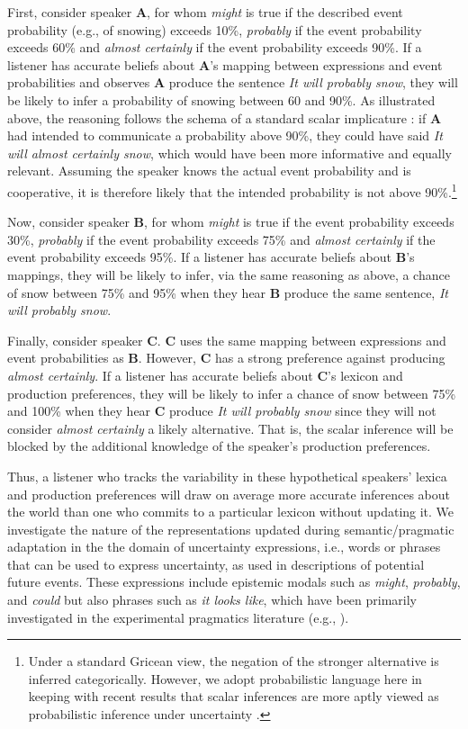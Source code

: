 \documentclass[man, floatsintext]{apa6}
\begin{document}
First, consider speaker {\bf A}, for whom \textit{might} is true if the described event probability (e.g., of snowing) exceeds 10\%, 
\textit{probably} if the event probability exceeds 60\% and \textit{almost certainly}  if the event probability exceeds 90\%.  If a listener has accurate beliefs about {\bf A}'s mapping between expressions and event probabilities and observes {\bf A}  produce the sentence \emph{It will probably snow}, they will be likely to infer a probability of snowing between 60 and 90\%. As illustrated above, the reasoning follows the schema of a standard scalar implicature \parencite{Grice1975, Horn1984}: if  {\bf A} had intended to communicate a probability above 90\%, they could have said \emph{It will almost certainly snow}, which would have been more informative and equally relevant. Assuming the speaker knows the actual event probability and is cooperative, it is therefore likely that the intended probability is not above 90\%.\footnote{Under a standard Gricean view, the negation of the stronger alternative is inferred categorically. However, we adopt probabilistic language here in keeping with recent results that scalar inferences are more aptly viewed as probabilistic inference under uncertainty \parencite{Goodman2013}.} 

Now, consider speaker {\bf B}, for whom \textit{might} is true if the event probability exceeds 30\%, 
\textit{probably} if the event probability exceeds 75\% and \textit{almost certainly}  if the event probability exceeds 95\%. If a listener has
accurate beliefs about {\bf B}'s mappings, they will be likely to infer, via the same reasoning as above, a chance of snow between 75\% and 95\% when they hear {\bf B} produce the same sentence, \textit{It will probably snow}.

Finally, consider speaker {\bf C}. {\bf C} uses the same mapping between expressions and event probabilities as {\bf B}. However, {\bf C} has a strong preference against 
producing \textit{almost certainly}. If a listener has accurate beliefs about {\bf C}'s lexicon and production preferences, 
they will be likely to infer a chance of snow between 75\% and 100\% when they hear {\bf C} produce \textit{It will probably snow} since they will not
consider  \textit{almost certainly} a likely alternative. That is, the scalar inference will be blocked by the additional knowledge of the speaker's production preferences. 

Thus, a listener who tracks the variability in these hypothetical speakers' lexica and production preferences will draw on average more accurate inferences about the world than one who commits to a particular lexicon without updating it. We investigate the nature of the representations updated during semantic/pragmatic adaptation in the the domain of uncertainty expressions, i.e., words or phrases that can be used to express uncertainty, as used in descriptions of potential future events. These expressions include epistemic modals such as \textit{might}, 
\textit{probably}, and \textit{could} \parencite[see, for example,][]{Kratzer1991,Hacquard2011} but also phrases such as \textit{it looks like}, which have been primarily investigated in the experimental pragmatics literature (e.g., \cite{Kurumada2014,Pogue2018}).
\end{document}

